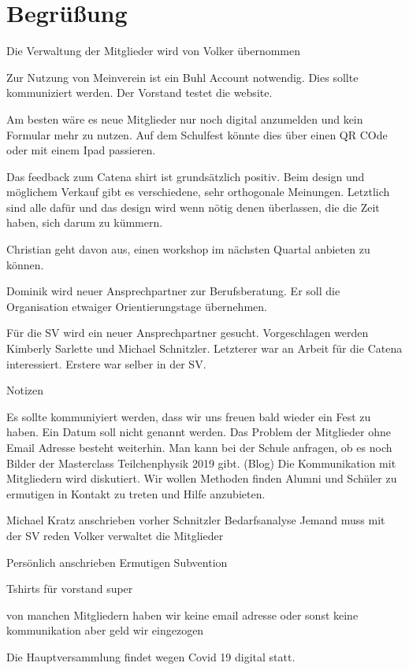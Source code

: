 \documentclass[a4paper, 11pt]{article}
\begin{document}
\newpage

\section*{Begrüßung}

Die Verwaltung der Mitglieder wird von Volker übernommen

Zur Nutzung von Meinverein ist ein Buhl Account notwendig.
Dies sollte kommuniziert werden.
Der Vorstand testet die website.

Am besten wäre es neue Mitglieder nur noch digital anzumelden und kein Formular mehr zu nutzen.
Auf dem Schulfest könnte dies über einen QR COde oder mit einem Ipad passieren.

Das feedback zum Catena shirt ist grundsätzlich positiv. 
Beim design und möglichem Verkauf gibt es verschiedene, sehr orthogonale Meinungen.
Letztlich sind alle dafür und das design wird wenn nötig denen überlassen, die die Zeit haben, sich darum zu kümmern.

Christian geht davon aus, einen workshop im nächsten Quartal anbieten zu können.

Dominik wird neuer Ansprechpartner zur Berufsberatung. Er soll die Organisation etwaiger Orientierungstage übernehmen.

Für die SV wird ein neuer Ansprechpartner gesucht. Vorgeschlagen werden Kimberly Sarlette und Michael Schnitzler.
Letzterer war an Arbeit für die Catena interessiert. Erstere war selber in der SV.


Notizen

Es sollte kommuniyiert werden, dass wir uns freuen bald wieder ein Fest zu haben. Ein Datum soll nicht genannt werden.
Das Problem der Mitglieder ohne Email Adresse besteht weiterhin.
Man kann bei der Schule anfragen, ob es noch Bilder der Masterclass Teilchenphysik 2019 gibt. (Blog)
Die Kommunikation mit Mitgliedern wird diskutiert. Wir wollen Methoden finden Alumni und Schüler zu ermutigen in Kontakt zu treten und Hilfe anzubieten.


Michael Kratz anschrieben vorher Schnitzler
Bedarfsanalyse
Jemand muss mit der SV reden
Volker verwaltet die Mitglieder

Persönlich anschrieben
Ermutigen
Subvention

Tshirts für vorstand super

von manchen Mitgliedern haben wir keine email adresse
oder sonst keine kommunikation aber geld wir eingezogen


Die Hauptversammlung findet wegen Covid 19 digital statt.
\end{document}
